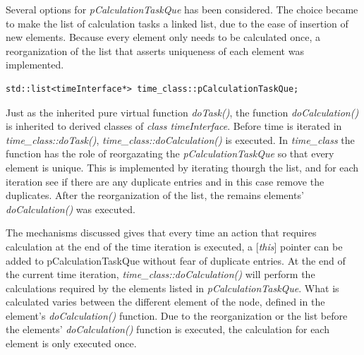 Several options for \emph{pCalculationTaskQue} has been considered.
The choice became to make the list of calculation tasks a linked list, due to the ease of insertion of new elements.
Because every element only needs to be calculated once, a reorganization of the list that asserts uniqueness of each element was implemented.

\begin{lstlisting}
std::list<timeInterface*> time_class::pCalculationTaskQue;
\end{lstlisting}

Just as the inherited pure virtual function \emph{doTask()}, the function \emph{doCalculation()} is inherited to derived classes of \emph{class timeInterface}.
Before time is iterated in \emph{time\_class::doTask()}, \emph{time\_class::doCalculation()} is executed.
In \emph{time\_class} the function has the role of reorgazating the \emph{pCalculationTaskQue} so that every element is unique.
This is implemented by iterating thourgh the list, and for each iteration see if there are any duplicate entries and in this case remove the duplicates.
After the reorganization of the list, the remains elements'  \emph{doCalculation()} was executed.

The mechanisms discussed gives that every time an action that requires calculation at the end of the time iteration is executed, a [\emph{this}] pointer can be added to pCalculationTaskQue without fear of duplicate entries. 
At the end of the current time iteration, \emph{time\_class::doCalculation()} will perform the calculations required by the elements listed in \emph{pCalculationTaskQue}.    %
What is calculated varies between the different element of the node, defined in the element's \emph{doCalculation()} function.
Due to the reorganization or the list before the elements' \emph{doCalculation()} function is executed, the calculation for each element is only executed once.



